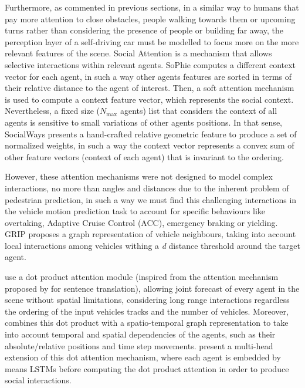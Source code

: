 Furthermore, as commented in previous sections, in a similar way to humans that pay more attention to close obstacles, people walking towards them or upcoming turns rather than considering the presence of people or building far away, the perception layer of a self-driving car must be modelled to focus more on the more relevant features of the scene. Social Attention is a mechanism that allows selective interactions within relevant agents. SoPhie \cite{sadeghian2019sophie} computes a different context vector for each agent, in such a way other agents features are sorted in terms of their relative distance to the agent of interest. Then, a soft attention mechanism is used to compute a context feature vector, which represents the social context. Nevertheless, a fixed size ($N_{\text{max}}$ agents) list that considers the context of all agents is sensitive to small variations \cite{mercat2020multi} of other agents positions. In that sense, SocialWays \cite{amirian2019social} presents a hand-crafted relative geometric feature to produce a set of normalized weights, in such a way the context vector represents a convex sum of other feature vectors (context of each agent) that is invariant to the ordering. 

However, these attention mechanisms were not designed to model complex interactions, no more than angles and distances due to the inherent problem of pedestrian prediction, in such a way we must find this challenging interactions in the vehicle motion prediction task to account for specific behaviours like overtaking, Adaptive Cruise Control (ACC), emergency braking or yielding. GRIP \cite{li2019grip} proposes a graph representation of vehicle neighbours, taking into account local interactions among vehicles withing a \textit{d} distance threshold around the target agent. 

\cite{vemula2018social} use a dot product attention module (inspired from the attention mechanism proposed by \cite{vaswani2017attention} for sentence translation), allowing joint forecast of every agent in the scene without spatial limitations, considering long range interactions regardless the ordering of the input vehicles tracks and the number of vehicles. Moreover, \cite{vemula2018social} combines this dot product with a spatio-temporal graph representation to take into account temporal and spatial dependencies of the agents, such as their absolute/relative positions and time step movements. \cite{mercat2020multi} present a multi-head extension of this dot attention mechanism, where each agent is embedded by means LSTMs before computing the dot product attention in order to produce social interactions. 

